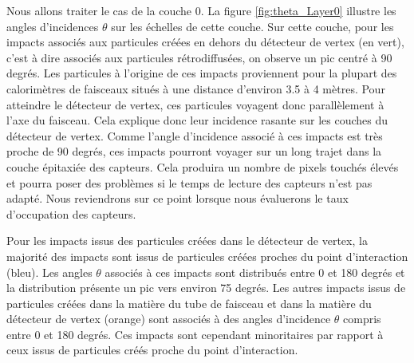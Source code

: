   Nous allons traiter le cas de la couche 0. La figure \ref{fig:theta_Layer0} illustre les angles d'incidences $\theta$ sur les \'echelles de cette couche. Sur cette couche, pour les impacts associ\'es aux particules cr\'e\'ees en dehors du d\'etecteur de vertex (en vert), c'est \`a dire associ\'es aux particules r\'etrodiffus\'ees, on observe un pic centr\'e \`a 90 degr\'es. Les particules \`a l'origine de ces impacts proviennent pour la plupart des calorim\`etres de faisceaux situ\'es \`a une distance d'environ 3.5 \`a 4 m\`etres. Pour atteindre le d\'etecteur de vertex, ces particules voyagent donc parall\`element \`a l'axe du faisceau. Cela explique donc leur incidence rasante sur les couches du d\'etecteur de vertex. Comme l'angle d'incidence associ\'e \`a ces impacts est tr\`es proche de 90 degr\'es, ces impacts pourront voyager sur un long trajet dans la couche \'epitaxiée des capteurs. Cela produira un nombre de pixels touch\'es \'elev\'es et pourra poser des probl\`emes si le temps de lecture des capteurs n'est pas adapt\'e. Nous reviendrons sur ce point lorsque nous \'evaluerons le taux d'occupation des capteurs.
  
  \medskip

  Pour les impacts issus des particules cr\'e\'ees dans le détecteur de vertex, la majorit\'e des impacts sont issus de particules cr\'e\'ees proches du point d'interaction (bleu). Les angles $\theta$ associ\'es \`a ces impacts sont distribu\'es entre 0 et 180 degr\'es et la distribution pr\'esente un pic vers environ 75 degr\'es. Les autres impacts issus de particules cr\'e\'ees dans la mati\`ere du tube de faisceau et dans la mati\`ere du d\'etecteur de vertex (orange) sont associ\'es \`a des angles d'incidence $\theta$ compris entre 0 et 180 degr\'es. Ces impacts sont cependant minoritaires par rapport \`a ceux issus de particules cr\'e\'es proche du point d'interaction.

  \medskip
  
